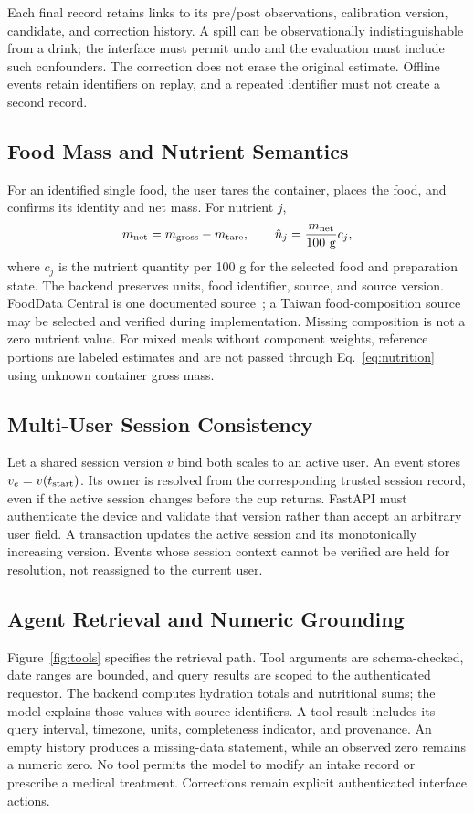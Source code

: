 

Each final record retains links to its pre/post observations, calibration version, candidate, and correction history. A spill can be observationally indistinguishable from a drink; the interface must permit undo and the evaluation must include such confounders. The correction does not erase the original estimate. Offline events retain identifiers on replay, and a repeated identifier must not create a second record.

\subsection{Food Mass and Nutrient Semantics}
For an identified single food, the user tares the container, places the food, and confirms its identity and net mass. For nutrient $j$,
\begin{equation}m_{\rm net}=m_{\rm gross}-m_{\rm tare},\qquad
\hat n_j=\frac{m_{\rm net}}{100\ {\rm g}}c_j,\label{eq:nutrition}\end{equation}
where $c_j$ is the nutrient quantity per 100 g for the selected food and preparation state. The backend preserves units, food identifier, source, and source version. FoodData Central is one documented source~\cite{usda}; a Taiwan food-composition source may be selected and verified during implementation. Missing composition is not a zero nutrient value. For mixed meals without component weights, reference portions are labeled estimates and are not passed through Eq.~\eqref{eq:nutrition} using unknown container gross mass.

\subsection{Multi-User Session Consistency}
Let a shared session version $v$ bind both scales to an active user. An event stores $v_e=v(t_{\rm start})$. Its owner is resolved from the corresponding trusted session record, even if the active session changes before the cup returns. FastAPI must authenticate the device and validate that version rather than accept an arbitrary user field. A transaction updates the active session and its monotonically increasing version. Events whose session context cannot be verified are held for resolution, not reassigned to the current user.

\subsection{Agent Retrieval and Numeric Grounding}
Figure~\ref{fig:tools} specifies the retrieval path. Tool arguments are schema-checked, date ranges are bounded, and query results are scoped to the authenticated requestor. The backend computes hydration totals and nutritional sums; the model explains those values with source identifiers. A tool result includes its query interval, timezone, units, completeness indicator, and provenance. An empty history produces a missing-data statement, while an observed zero remains a numeric zero. No tool permits the model to modify an intake record or prescribe a medical treatment. Corrections remain explicit authenticated interface actions.


